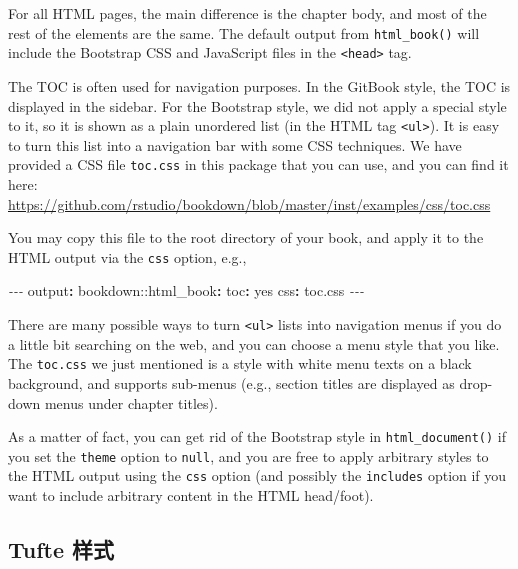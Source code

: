\documentclass[
  12pt,
]{krantz}
\newenvironment{Shaded}{\begin{snugshade}}{\end{snugshade}}
\newcommand{\AttributeTok}[1]{\textcolor[rgb]{0.77,0.63,0.00}{#1}}
\newcommand{\CharTok}[1]{\textcolor[rgb]{0.31,0.60,0.02}{#1}}
\newcommand{\FunctionTok}[1]{\textcolor[rgb]{0.00,0.00,0.00}{#1}}
\newcommand{\KeywordTok}[1]{\textcolor[rgb]{0.13,0.29,0.53}{\textbf{#1}}}
\newcommand{\PreprocessorTok}[1]{\textcolor[rgb]{0.56,0.35,0.01}{\textit{#1}}}
\theoremstyle{definition}
\theoremstyle{definition}
\theoremstyle{definition}
\theoremstyle{definition}
\theoremstyle{remark}
\begin{document}
For all HTML pages, the main difference is the chapter body, and most of the rest of the elements are the same. The default output from \texttt{html\_book()} will include the Bootstrap CSS and JavaScript files in the \texttt{\textless{}head\textgreater{}} tag.

The TOC is often used for navigation purposes. In the GitBook style, the TOC is displayed in the sidebar. For the Bootstrap style, we did not apply a special style to it, so it is shown as a plain unordered list (in the HTML tag \texttt{\textless{}ul\textgreater{}}). It is easy to turn this list into a navigation bar with some CSS techniques. We have provided a CSS file \texttt{toc.css} in this package that you can use, and you can find it here: \url{https://github.com/rstudio/bookdown/blob/master/inst/examples/css/toc.css}

You may copy this file to the root directory of your book, and apply it to the HTML output via the \texttt{css} option, e.g.,

\begin{Shaded}
\begin{Highlighting}[]
\PreprocessorTok{{-}{-}{-}}
\FunctionTok{output}\KeywordTok{:}
\AttributeTok{  bookdown:}\FunctionTok{:html\_book}\KeywordTok{:}
\AttributeTok{    }\FunctionTok{toc}\KeywordTok{:}\AttributeTok{ }\CharTok{yes}
\AttributeTok{    }\FunctionTok{css}\KeywordTok{:}\AttributeTok{ toc.css}
\PreprocessorTok{{-}{-}{-}}
\end{Highlighting}
\end{Shaded}

There are many possible ways to turn \texttt{\textless{}ul\textgreater{}} lists into navigation menus if you do a little bit searching on the web, and you can choose a menu style that you like. The \texttt{toc.css} we just mentioned is a style with white menu texts on a black background, and supports sub-menus (e.g., section titles are displayed as drop-down menus under chapter titles).

As a matter of fact, you can get rid of the Bootstrap style in \texttt{html\_document()} if you set the \texttt{theme} option to \texttt{null}, and you are free to apply arbitrary styles to the HTML output using the \texttt{css} option (and possibly the \texttt{includes} option if you want to include arbitrary content in the HTML head/foot).

\hypertarget{tufte-style}{%
\subsection{Tufte 样式}\label{tufte-style}}
\end{document}
